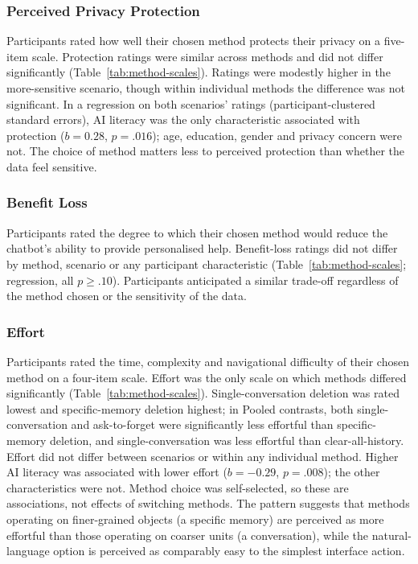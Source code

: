 \documentclass[conference,compsoc]{IEEEtran}
\begin{document}
\subsubsection{Perceived Privacy Protection}

Participants rated how well their chosen method protects their privacy on a five-item scale. Protection ratings were similar across methods and did not differ significantly (Table~\ref{tab:method-scales}). Ratings were modestly higher in the more-sensitive scenario, though within individual methods the difference was not significant. In a regression on both scenarios' ratings (participant-clustered standard errors), AI literacy was the only characteristic associated with protection ($b=0.28$, $p=.016$); age, education, gender and privacy concern were not. The choice of method matters less to perceived protection than whether the data feel sensitive.

\subsubsection{Benefit Loss}

Participants rated the degree to which their chosen method would reduce the chatbot's ability to provide personalised help. Benefit-loss ratings did not differ by method, scenario or any participant characteristic (Table~\ref{tab:method-scales}; regression, all $p\geq.10$). Participants anticipated a similar trade-off regardless of the method chosen or the sensitivity of the data.

\subsubsection{Effort}
\label{sec:effort}

Participants rated the time, complexity and navigational difficulty of their chosen method on a four-item scale. Effort was the only scale on which methods differed significantly (Table~\ref{tab:method-scales}). Single-conversation deletion was rated lowest and specific-memory deletion highest; in Pooled contrasts, both single-conversation and ask-to-forget were significantly less effortful than specific-memory deletion, and single-conversation was less effortful than clear-all-history. Effort did not differ between scenarios or within any individual method. Higher AI literacy was associated with lower effort ($b=-0.29$, $p=.008$); the other characteristics were not. Method choice was self-selected, so these are associations, not effects of switching methods. The pattern suggests that methods operating on finer-grained objects (a specific memory) are perceived as more effortful than those operating on coarser units (a conversation), while the natural-language option is perceived as comparably easy to the simplest interface action.
\end{document}
